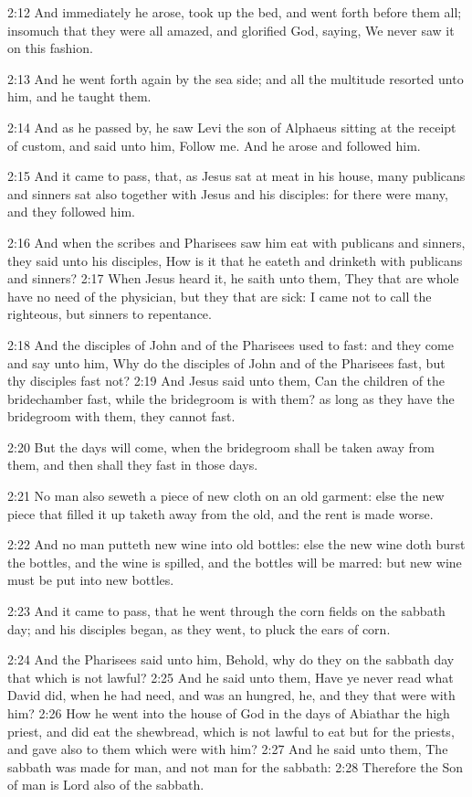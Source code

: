 2:12 And immediately he arose, took up the bed, and went forth before them all; insomuch that they were all amazed, and glorified God, saying, We never saw it on this fashion.

2:13 And he went forth again by the sea side; and all the multitude resorted unto him, and he taught them.

2:14 And as he passed by, he saw Levi the son of Alphaeus sitting at the receipt of custom, and said unto him, Follow me. And he arose and followed him.

2:15 And it came to pass, that, as Jesus sat at meat in his house, many publicans and sinners sat also together with Jesus and his disciples: for there were many, and they followed him.

2:16 And when the scribes and Pharisees saw him eat with publicans and sinners, they said unto his disciples, How is it that he eateth and drinketh with publicans and sinners?  2:17 When Jesus heard it, he saith unto them, They that are whole have no need of the physician, but they that are sick: I came not to call the righteous, but sinners to repentance.

2:18 And the disciples of John and of the Pharisees used to fast: and they come and say unto him, Why do the disciples of John and of the Pharisees fast, but thy disciples fast not?  2:19 And Jesus said unto them, Can the children of the bridechamber fast, while the bridegroom is with them? as long as they have the bridegroom with them, they cannot fast.

2:20 But the days will come, when the bridegroom shall be taken away from them, and then shall they fast in those days.

2:21 No man also seweth a piece of new cloth on an old garment: else the new piece that filled it up taketh away from the old, and the rent is made worse.

2:22 And no man putteth new wine into old bottles: else the new wine doth burst the bottles, and the wine is spilled, and the bottles will be marred: but new wine must be put into new bottles.

2:23 And it came to pass, that he went through the corn fields on the sabbath day; and his disciples began, as they went, to pluck the ears of corn.

2:24 And the Pharisees said unto him, Behold, why do they on the sabbath day that which is not lawful?  2:25 And he said unto them, Have ye never read what David did, when he had need, and was an hungred, he, and they that were with him?  2:26 How he went into the house of God in the days of Abiathar the high priest, and did eat the shewbread, which is not lawful to eat but for the priests, and gave also to them which were with him?  2:27 And he said unto them, The sabbath was made for man, and not man for the sabbath: 2:28 Therefore the Son of man is Lord also of the sabbath.

